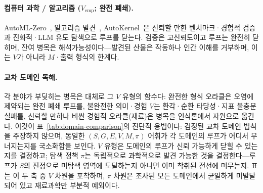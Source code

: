 \documentclass[11pt]{article}
\begin{document}
\paragraph{컴퓨터 과학 / 알고리즘 ($V_\text{emp}$; 완전 폐쇄).} AutoML-Zero~\citep{real2020automlzero}, 알고리즘 발견~\citep{surina2025algodiscovery}, AutoKernel~\citep{jaber2026autokernel}은 신뢰할 만한 벤치마크·경험적 검증과 진화적·LLM 유도 탐색으로 루프를 닫는다. 검증은 고신뢰도이고 루프는 완전히 닫히며, 잔여 병목은 해석가능성이다---발견된 산물은 작동하나 인간 이해를 거부하며, 이는 $V$가 아니라 $M$·출력 형식의 한계다.

\paragraph{교차 도메인 독해.} 각 분야가 부딪히는 병목은 대체로 그 $V$ 유형의 함수다: 완전한 형식 오라클은 오염에 제약되는 완전 폐쇄 루프를, 불완전한 의미·경험 $V$는 환각·순환 타당성·지표 불충분 실패를, 신뢰할 만하나 비싼 경험적 오라클(재료)은 병목을 인식론에서 자원으로 옮긴다. 이것이 표~\ref{tab:domain-comparison}의 진단적 용법이다: 검정된 교차 도메인 법칙을 주장하지 않으며, 동일한 $(S,G,E,V,M,\pi)$ 어휘가 각 도메인의 루프가 어디서 무너지는지를 국소화함을 보인다. $V$ 유형은 도메인의 루프가 신뢰 가능하게 닫힐 수 있는지를 결정하고; 탐색 정책 $\pi$는 독립적으로 과학적으로 발견 가능한 것을 결정한다---루프가 $S$의 진정으로 미탐색 영역에 도달하는지 아니면 이미 착취된 전선에 머무는지. 표는 이 두 축 중 $V$ 차원을 포착하며, $\pi$ 차원은 조사된 모든 도메인에서 균일하게 미발달되어 있고 재료과학만 부분적 예외이다.
\end{document}
